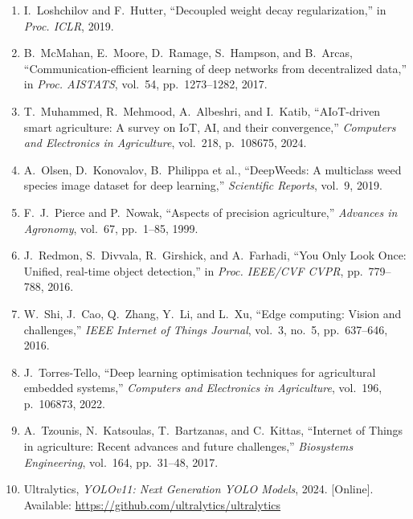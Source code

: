 \documentclass[12pt,a4paper]{report}
\begin{document}
\begin{enumerate}
    \item I.~Loshchilov and F.~Hutter, ``Decoupled weight decay regularization,'' in \textit{Proc. ICLR}, 2019.

    \item B.~McMahan, E.~Moore, D.~Ramage, S.~Hampson, and B.~Arcas, ``Communication-efficient learning of deep networks from decentralized data,'' in \textit{Proc. AISTATS}, vol.~54, pp.~1273--1282, 2017.

    \item T.~Muhammed, R.~Mehmood, A.~Albeshri, and I.~Katib, ``AIoT-driven smart agriculture: A survey on IoT, AI, and their convergence,'' \textit{Computers and Electronics in Agriculture}, vol.~218, p.~108675, 2024.

    \item A.~Olsen, D.~Konovalov, B.~Philippa et al., ``DeepWeeds: A multiclass weed species image dataset for deep learning,'' \textit{Scientific Reports}, vol.~9, 2019.

    \item F.~J.~Pierce and P.~Nowak, ``Aspects of precision agriculture,'' \textit{Advances in Agronomy}, vol.~67, pp.~1--85, 1999.

    \item J.~Redmon, S.~Divvala, R.~Girshick, and A.~Farhadi, ``You Only Look Once: Unified, real-time object detection,'' in \textit{Proc. IEEE/CVF CVPR}, pp.~779--788, 2016.

    \item W.~Shi, J.~Cao, Q.~Zhang, Y.~Li, and L.~Xu, ``Edge computing: Vision and challenges,'' \textit{IEEE Internet of Things Journal}, vol.~3, no.~5, pp.~637--646, 2016.

    \item J.~Torres-Tello, ``Deep learning optimisation techniques for agricultural embedded systems,'' \textit{Computers and Electronics in Agriculture}, vol.~196, p.~106873, 2022.

    \item A.~Tzounis, N.~Katsoulas, T.~Bartzanas, and C.~Kittas, ``Internet of Things in agriculture: Recent advances and future challenges,'' \textit{Biosystems Engineering}, vol.~164, pp.~31--48, 2017.

    \item Ultralytics, \textit{YOLOv11: Next Generation YOLO Models}, 2024. [Online]. Available: \url{https://github.com/ultralytics/ultralytics}
\end{enumerate}

\appendix
\end{document}
